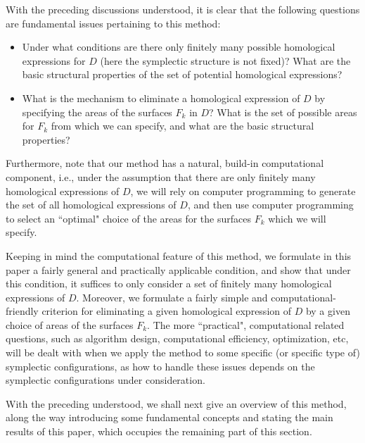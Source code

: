 \documentclass[11pt]{amsart}
\theoremstyle{plain}
\numberwithin{theorem}{section}
\theoremstyle{definition}
\begin{document}
\vspace{2mm}

With the preceding discussions understood, it is clear that the following questions are fundamental issues pertaining to this method:

\begin{itemize}
\item [{(1)}] Under what conditions are there only finitely many possible homological expressions for $D$ (here the symplectic structure is not fixed)? What are the basic structural properties of the set of potential homological expressions?
\item [{(2)}] What is the mechanism to eliminate a homological expression of $D$ by specifying the areas of the surfaces $F_k$ in $D$? What is the set of possible areas for $F_k$ from which we can specify, and what are the basic structural properties?
\end{itemize}
Furthermore, note that our method has a natural, build-in computational component, i.e., under the assumption that there are only finitely many homological expressions of $D$, we will rely on computer programming to generate the set of all homological expressions of $D$, and then use computer programming to select an ``optimal" choice of the areas for the surfaces $F_k$ which we will specify. 

Keeping in mind the computational feature of this method, we formulate in this paper a fairly general and practically applicable condition, and show that under this condition, it suffices to only consider a set of finitely many homological expressions of $D$. Moreover, we formulate a fairly simple and computational-friendly criterion for eliminating a given homological expression of $D$ by a given choice of areas of the surfaces $F_k$. The more
``practical", computational related questions, such as algorithm design, computational efficiency, optimization, etc, 
will be dealt with when we apply the method to some specific (or specific type of) symplectic configurations, as how to handle these issues depends on the symplectic configurations under consideration. 

\vspace{2mm}

With the preceding understood, we shall next give an overview of this method, along the way introducing some fundamental concepts and stating the main results of this paper, which occupies the remaining part of this section.
\end{document}
